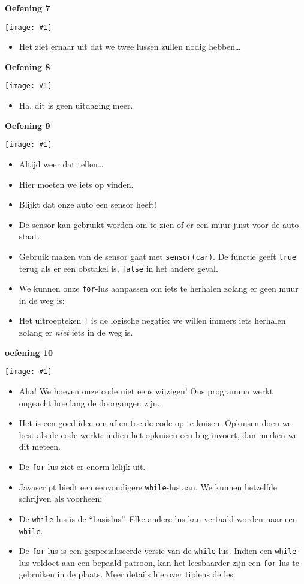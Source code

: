 \documentclass[a4paper]{article}
\newcommand{\newexercise}[1]{\clearpage\begin{center}\Huge\bf #1\end{center}}
\newcommand{\exercisemap}[1]{\begin{center}\texttt{[image: \#1]}\end{center}}
\newcommand{\code}[1]{
  \begin{center}
    \begin{minipage}{.8\linewidth}
      
    \end{minipage}
  \end{center}
}
\begin{document}
\newexercise{Oefening 7}
\exercisemap{ex7}

\begin{itemize}
  \item Het ziet ernaar uit dat we twee lussen zullen nodig hebben\dots
\end{itemize}


\newexercise{Oefening 8}
\exercisemap{ex8}

\begin{itemize}
  \item Ha, dit is geen uitdaging meer.
\end{itemize}


\newexercise{Oefening 9}
\exercisemap{ex9}

\begin{itemize}
  \item Altijd weer dat tellen\dots
  \item Hier moeten we iets op vinden.
  \item Blijkt dat onze auto een sensor heeft!
  \item De sensor kan gebruikt worden om te zien of er een muur juist voor de auto staat.
  \item Gebruik maken van de sensor gaat met \verb'sensor(car)'.
        De functie geeft \verb'true' terug als er een obstakel is, \verb'false' in het andere geval.
  \item We kunnen onze \verb'for'-lus aanpassen om iets te herhalen zolang er geen muur in de weg is:
        \code{for-sensor.js}
  \item Het uitroepteken \verb'!' is de logische negatie: we willen immers
        iets herhalen zolang er \emph{niet} iets in de weg is.
\end{itemize}


\newexercise{oefening 10}
\exercisemap{ex10}

\begin{itemize}
  \item Aha! We hoeven onze code niet eens wijzigen! Ons programma werkt
        ongeacht hoe lang de doorgangen zijn.
  \item Het is een goed idee om af en toe de code op te kuisen.
        Opkuisen doen we best als de code werkt: indien
        het opkuisen een bug invoert, dan merken we dit meteen.
  \item De \verb'for'-lus ziet er enorm lelijk uit.
  \item Javascript biedt een eenvoudigere \verb'while'-lus aan.
        We kunnen hetzelfde schrijven als voorheen:
        \code{while.js}
  \item De \verb'while'-lus is de ``basislus''. Elke andere lus
        kan vertaald worden naar een \verb'while'.
  \item De \verb'for'-lus is een gespecialiseerde versie van de
        \verb'while'-lus. Indien een \verb'while'-lus voldoet aan een bepaald
        patroon, kan het leesbaarder zijn een \verb'for'-lus te gebruiken in de plaats.
        Meer details hierover tijdens de les.
\end{itemize}
\end{document}
